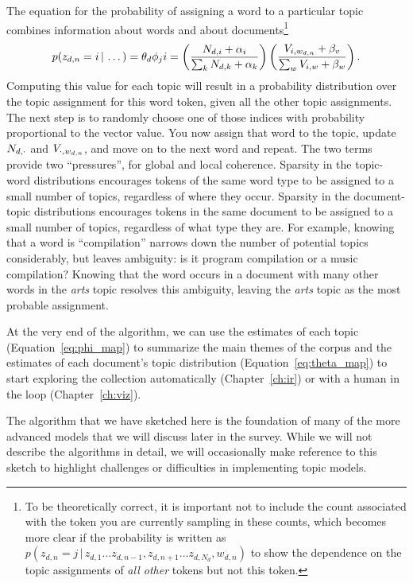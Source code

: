 The equation for the probability of assigning a word to a particular topic
combines information about words and about documents\footnote{To be theoretically correct, it is important
not to include the count associated with the token you are currently sampling in
these counts, which becomes more clear if the probability is written as
$p(z_{d,n}=j\,|\,z_{d,1}\dots z_{d,n-1},z_{d,n+1}\dots z_{d,N_d}, w_{d,n})$ to
show the dependence on the topic assignments of \emph{all other} tokens but not
this token.}
\begin{align}
p(z_{d,n}=i \, | \, \dots) = \theta_d
\phi_ji= \left(\frac{N_{d,i} + \alpha_i}{\sum_k N_{d,k} + \alpha_k} \right) \left( \frac{V_{i,w_{d,n}} + \beta_v}{\sum_w V_{i,w} +
    \beta_w} \right).
\label{eq:sampling}
\end{align}
Computing this value for each topic will result in a probability distribution over the topic assignment for this word token, given all the other topic assignments.  The next step is to randomly choose one of those indices with
probability proportional to the vector value.  You now assign that word to the
topic, update $N_{d,\cdot}$ and $V_{\cdot,w_{d,n}}$, and move on to the next word and repeat.
The two terms provide two ``pressures'', for global and local coherence. Sparsity in the topic-word distributions encourages tokens of the same word type to be assigned to a small number of topics,  regardless of where they occur. Sparsity in the document-topic distributions encourages tokens in the same document to be assigned to a small number of topics, regardless of what type they are.
For example, knowing that a word is ``compilation'' narrows down the number of potential topics considerably, but leaves ambiguity: is it program compilation or a music compilation? Knowing that the word occurs in a document with many other words in the \emph{arts} topic resolves this ambiguity, leaving the \emph{arts} topic as the most probable assignment.

At the very end of the algorithm, we can use the estimates of each topic
(Equation~\ref{eq:phi_map}) to summarize the main themes of the corpus and the
estimates of each document's topic distribution (Equation~\ref{eq:theta_map}) to
start exploring the collection automatically (Chapter~\ref{ch:ir}) or with a
human in the loop (Chapter~\ref{ch:viz}).

The algorithm that we have sketched here is the foundation of many of the more
advanced models that we will discuss later in the survey.  While we will not describe
the algorithms in detail, we will occasionally make reference to this sketch to
highlight challenges or difficulties in implementing topic models.

